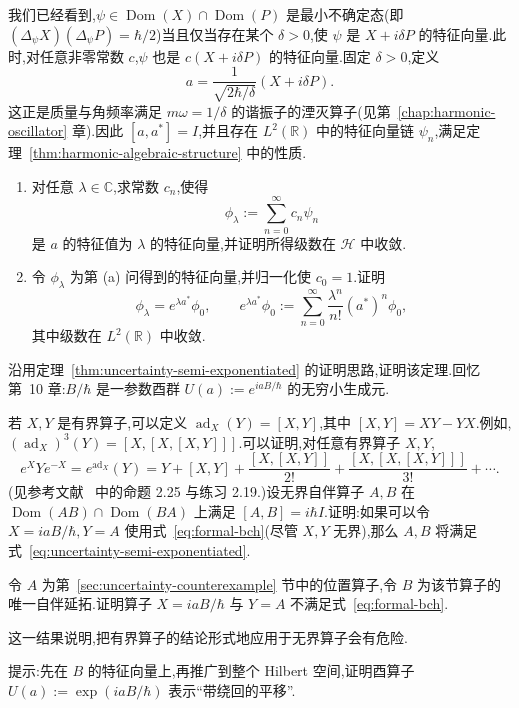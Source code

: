 \begin{exercise}[相干态与降算子]\label{ex:uncertainty-coherent-states}
我们已经看到,$\psi\in\operatorname{Dom}(X)\cap\operatorname{Dom}(P)$ 是最小不确定态(即 $(\Delta_\psi X)(\Delta_\psi P)=\hbar/2$)当且仅当存在某个 $\delta>0$,使 $\psi$ 是 $X+i\delta P$ 的特征向量.此时,对任意非零常数 $c$,$\psi$ 也是 $c(X+i\delta P)$ 的特征向量.固定 $\delta>0$,定义
\[
a=\frac{1}{\sqrt{2\hbar/\delta}}(X+i\delta P).
\]
这正是质量与角频率满足 $m\omega=1/\delta$ 的谐振子的湮灭算子(见第~\ref{chap:harmonic-oscillator} 章).因此 $[a,a^*]=I$,并且存在 $L^2(\mathbb R)$ 中的特征向量链 $\psi_n$,满足定理~\ref{thm:harmonic-algebraic-structure} 中的性质.
\begin{enumerate}
\item 对任意 $\lambda\in\mathbb C$,求常数 $c_n$,使得
\[
\phi_\lambda:=\sum_{n=0}^{\infty}c_n\psi_n
\]
是 $a$ 的特征值为 $\lambda$ 的特征向量,并证明所得级数在 $\mathcal H$ 中收敛.
\item 令 $\phi_\lambda$ 为第 (a) 问得到的特征向量,并归一化使 $c_0=1$.证明
\[
\phi_\lambda=e^{\lambda a^*}\phi_0,
\qquad
e^{\lambda a^*}\phi_0:=\sum_{n=0}^{\infty}\frac{\lambda^n}{n!}(a^*)^n\phi_0,
\]
其中级数在 $L^2(\mathbb R)$ 中收敛.
\end{enumerate}
\end{exercise}

\begin{exercise}[证明半指数化关系]\label{ex:uncertainty-prove-semi-exponentiated}
沿用定理~\ref{thm:uncertainty-semi-exponentiated} 的证明思路,证明该定理.回忆第~10 章:$B/\hbar$ 是一参数酉群 $U(a):=e^{iaB/\hbar}$ 的无穷小生成元.
\end{exercise}

\begin{exercise}[形式 BCH 展开]\label{ex:uncertainty-formal-bch}
若 $X,Y$ 是有界算子,可以定义 $\operatorname{ad}_X(Y)=[X,Y]$,其中 $[X,Y]=XY-YX$.例如,$(\operatorname{ad}_X)^3(Y)=[X,[X,[X,Y]]]$.可以证明,对任意有界算子 $X,Y$,
\[
e^XYe^{-X}=e^{\operatorname{ad}_X}(Y)
=Y+[X,Y]+\frac{[X,[X,Y]]}{2!}+\frac{[X,[X,[X,Y]]]}{3!}+\cdots.
\label{eq:formal-bch}
\]
(见参考文献~\cite{Hall2013} 中的命题 2.25 与练习 2.19.)设无界自伴算子 $A,B$ 在 $\operatorname{Dom}(AB)\cap\operatorname{Dom}(BA)$ 上满足 $[A,B]=i\hbar I$.证明:如果可以令 $X=iaB/\hbar,Y=A$ 使用式~\eqref{eq:formal-bch}(尽管 $X,Y$ 无界),那么 $A,B$ 将满足式~\eqref{eq:uncertainty-semi-exponentiated}.
\end{exercise}

\begin{exercise}\label{ex:uncertainty-bch-counterexample}
令 $A$ 为第~\ref{sec:uncertainty-counterexample} 节中的位置算子,令 $B$ 为该节算子的唯一自伴延拓.证明算子 $X=iaB/\hbar$ 与 $Y=A$ 不满足式~\eqref{eq:formal-bch}.

\begin{note}
这一结果说明,把有界算子的结论形式地应用于无界算子会有危险.
\end{note}

提示:先在 $B$ 的特征向量上,再推广到整个 Hilbert 空间,证明酉算子 $U(a):=\exp(iaB/\hbar)$ 表示“带绕回的平移”.
\end{exercise}

